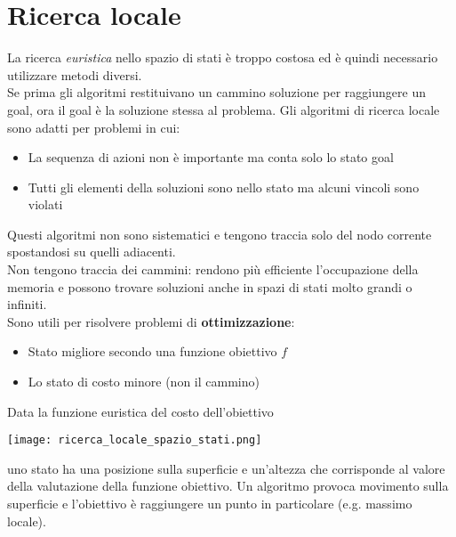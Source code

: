 \newpage
\section{Ricerca locale}
La ricerca \emph{euristica} nello spazio di stati è troppo costosa ed è quindi necessario utilizzare metodi diversi. \\ Se prima gli algoritmi restituivano un cammino soluzione per raggiungere un goal, ora il goal è la soluzione stessa al problema. Gli algoritmi di ricerca locale sono adatti per problemi in cui:
\begin{itemize}
	\item La sequenza di azioni non è importante ma conta solo lo stato goal
	\item Tutti gli elementi della soluzioni sono nello stato ma alcuni vincoli sono violati
\end{itemize}
Questi algoritmi non sono sistematici e tengono traccia solo del nodo corrente spostandosi su quelli adiacenti. \\
Non tengono traccia dei cammini: rendono più efficiente l'occupazione della memoria e possono trovare soluzioni anche in spazi di stati molto grandi o infiniti.\\
Sono utili per risolvere problemi di \textbf{ottimizzazione}:
\begin{itemize}
	\item Stato migliore secondo una funzione obiettivo $f$
	\item Lo stato di costo minore (non il cammino)
\end{itemize}
Data la funzione euristica del costo dell'obiettivo
\begin{center}
	\texttt{[image: ricerca\_locale\_spazio\_stati.png]}
\end{center}
uno stato ha una posizione sulla superficie e un'altezza che corrisponde al valore della valutazione della funzione obiettivo. Un algoritmo provoca movimento sulla superficie e l'obiettivo è raggiungere un punto in particolare (e.g. massimo locale).
